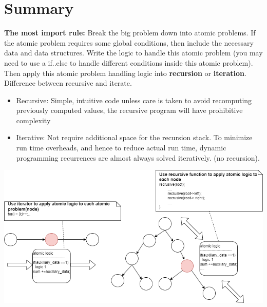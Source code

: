 \documentclass[a4paper,11pt,twoside]{book}
\begin{document}
	
\section{Summary}

	\par \textbf{The most import rule:} Break the big problem down into atomic problems. If the atomic problem requires some global conditions, then include the necessary data and data structures. Write the logic to handle this atomic problem (you may need to use a if..else to handle different conditions inside this atomic problem). Then apply this atomic problem handling logic into \textbf{recursion} or \textbf{iteration}. Difference between recursive and iterate.
	
	\begin{itemize}
		\item Recursive: Simple, intuitive code unless care is taken to avoid recomputing previously computed values, the recursive program will have prohibitive complexity
		
		\item Iterative: Not require additional space for the recursion stack. To minimize run time overheads, and hence to reduce actual run time, dynamic programming recurrences are almost always solved iteratively. (no recursion).
	\end{itemize}
	

\begin{center}
	\includegraphics[scale=0.50]{pics/rule.drawio.png}
\end{center}
\end{document}
